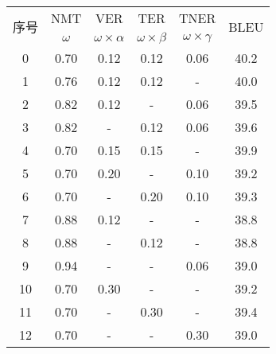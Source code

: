 
\begin{table}[!htbp]
    \label{tab:4_ablation_study}
    \centering
    \footnotesize%
    \setlength{\tabcolsep}{8pt}%
    \renewcommand{\arraystretch}{1.2}%
\begin{tabular}{cccccc}
\hline
\multirow{2}{*}{序号} & NMT & VER & TER & TNER & \multirow{2}{*}{BLEU} \\
\cline{2-5}
   & $\omega$ & $\omega \times \alpha$ & $\omega \times \beta$ & $\omega \times \gamma$ & \\
\hline
0  & 0.70 & 0.12 & 0.12 & 0.06 & 40.2 \\
\hline
1  & 0.76 & 0.12 & 0.12 &  -   & 40.0 \\
2  & 0.82 & 0.12 & -    & 0.06 & 39.5 \\
3  & 0.82 & -    & 0.12 & 0.06 & 39.6 \\
\hline
4  & 0.70 & 0.15 & 0.15 & -    & 39.9 \\
5  & 0.70 & 0.20 & -    & 0.10 & 39.2 \\
6  & 0.70 & -    & 0.20 & 0.10 & 39.3 \\
\hline
7  & 0.88 & 0.12 & -    & -    & 38.8 \\
8  & 0.88 & -    & 0.12 & -    & 38.8 \\
9  & 0.94 & -    & -    & 0.06 & 39.0 \\
\hline
10 & 0.70 & 0.30 & -    & -    & 39.2 \\
11 & 0.70 & -    & 0.30 & -    & 39.4 \\
12 & 0.70 & -    & -    & 0.30 & 39.0 \\
\hline
\end{tabular}
\end{table}